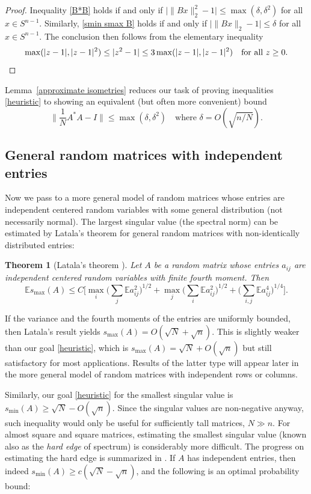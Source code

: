 \documentclass[10pt, openany]{book}
\newtheorem{theorem}{Theorem}[chapter]
\theoremstyle{remark}
\def \E {\mathbb{E}}
\def \d {\delta}
\def \smin {s_{\min}}
\def \smax {s_{\max}}
\begin{document}
\begin{proof}
Inequality \eqref{B*B} holds if and only if 
$\big| \|Bx\|_2^2 - 1 \big| \le \max(\d,\d^2)$ for all $x \in S^{n-1}$. 
Similarly, \eqref{smin smax B} holds if and only if 
$\big| \|Bx\|_2 - 1 \big| \le \d$ for all $x \in S^{n-1}$.
The conclusion then follows from the elementary inequality
$$
\max(|z-1|, |z-1|^2) \le |z^2-1| \le 3 \max(|z-1|, |z-1|^2) \quad \text{for all } z \ge 0.  \qedhere
$$ 
\end{proof}

Lemma~\ref{approximate isometries} reduces our task of proving 
inequalities \eqref{heuristic} to showing an equivalent (but often more convenient) 
bound 
$$
\big\| \frac{1}{N} A^*A-I \big\| \le \max(\d, \d^2)
\quad \text{where } \d = O(\sqrt{n/N}).
$$ 




\subsection{General random matrices with independent entries}

Now we pass to a more general model of random matrices whose entries
are independent centered random variables with some general distribution 
(not necessarily normal). The largest singular value (the spectral norm) 
can be estimated by Latala's theorem for general random matrices with non-identically
distributed entries:

\begin{theorem}[Latala's theorem \cite{Latala}]                \label{Latala}
Let $A$ be a random matrix whose entries $a_{ij}$ are independent centered
random variables with finite fourth moment. Then
$$
\E \smax(A) \le C \Big[ \max_i \big( \sum_j \E a_{ij}^2 \big)^{1/2}
  +  \max_j \big( \sum_i \E a_{ij}^2 \big)^{1/2}
  +  \big( \sum_{i,j} \E a_{ij}^4 \big)^{1/4}  \Big].
$$
\end{theorem}

If the variance and the fourth moments of the entries are uniformly bounded,
then Latala's result yields
$\smax(A) = O(\sqrt{N} + \sqrt{n})$. This is slightly weaker than our goal \eqref{heuristic},
which is $\smax(A) = \sqrt{N} + O(\sqrt{n})$ but still satisfactory for most applications.
Results of the latter type will appear later in the more general model of random matrices
with independent rows or columns.

Similarly, our goal \eqref{heuristic} for the smallest singular value is $\smin(A) \ge \sqrt{N} - O(\sqrt{n})$. 
Since the singular values are non-negative anyway, such inequality would only be useful 
for sufficiently tall matrices, $N \gg n$. For almost square and square matrices, estimating 
the smallest singular value (known also as the {\em hard edge} of spectrum) is considerably more difficult. 
The progress on estimating the hard edge is summarized in \cite{RV ICM}.
If $A$ has independent entries, then indeed $\smin(A) \ge c (\sqrt{N} - \sqrt{n})$,
and the following is an optimal probability bound:
\end{document}
